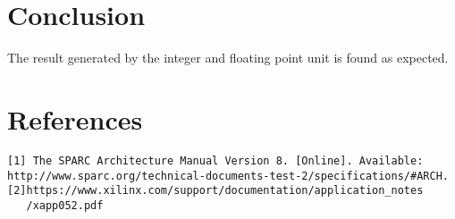 \documentclass[12pt]{article}
\begin{document}
\section*{Conclusion}
The result generated by the integer and floating point unit is found as expected.
\section*{References}
\begin{lstlisting}
[1] The SPARC Architecture Manual Version 8. [Online]. Available: 
http://www.sparc.org/technical-documents-test-2/specifications/#ARCH. 
[2]https://www.xilinx.com/support/documentation/application_notes
   /xapp052.pdf
\end{lstlisting}
\end{document}
